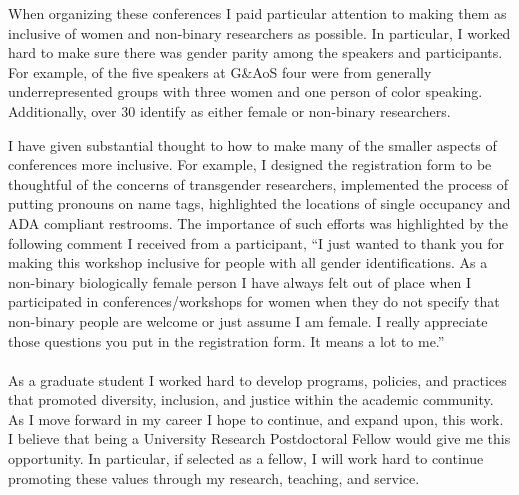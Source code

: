 \documentclass[11pt]{article}
\begin{document}
When organizing these conferences I paid particular attention to making them as inclusive of women and non-binary researchers as possible. In particular, I worked hard to make sure there was gender parity among the speakers and participants.  For example, of the five speakers at G\&AoS four were from generally underrepresented groups with three women and one person of color speaking. Additionally, over 30 identify as either female or non-binary researchers. 

I have given substantial thought to how to make many of the smaller aspects of conferences more inclusive. For example, I designed the registration form to be thoughtful of the concerns of transgender researchers, implemented the process of putting pronouns on name tags, highlighted the locations of single occupancy and ADA compliant restrooms. The importance of such efforts was highlighted by the following comment I received from a participant, ``I just wanted to thank you for making this workshop inclusive for people with all gender identifications. As a non-binary biologically female person I have always felt out of place when I participated in conferences/workshops for women when they do not specify that non-binary people are welcome or just assume I am female. I really appreciate those questions you put in the registration form. It means a lot to me.''
\\
\\
As a graduate student I worked hard to develop programs, policies, and practices that promoted diversity, inclusion, and justice within the academic community. As I move forward in my career I hope to continue, and expand upon, this work. I believe that being a University Research Postdoctoral Fellow would give me this opportunity.  In particular, if selected as a fellow, I will work hard to continue promoting these values through my research, teaching, and service. 



%
%
%
\end{document}
